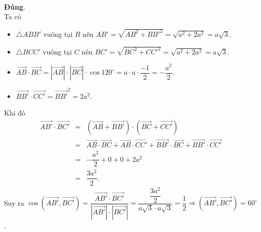 \begin{ex}
{\begin{itemchoice}
\begin{eqnarray*}
\end{eqnarray*}
\itemch \textbf{Đúng}.\\Ta có
\begin{itemize}
 \item $\triangle ABB'$ vuông tại $B$ nên $AB'=\sqrt{AB^2+BB'^2}=\sqrt{a^2+2a^2}=a\sqrt{3}$.
 \item $\triangle BCC'$ vuông tại $C$ nên $BC'=\sqrt{BC^2+CC'^2}=\sqrt{a^2+2a^2}=a\sqrt{3}$.
 \item $\overrightarrow{AB}\cdot\overrightarrow{BC}=\left|\overrightarrow{AB}\right|\cdot \left|\overrightarrow{BC}\right|\cdot \cos 120^\circ=a\cdot a\cdot\dfrac{-1}{2}=-\dfrac{a^2}{2}$.
 \item $\overrightarrow{BB'}\cdot\overrightarrow{CC'}=\overrightarrow{BB'}^2=2a^2$.
\end{itemize}
Khi đó
\allowdisplaybreaks
\begin{eqnarray*}
\overrightarrow{AB'}\cdot\overrightarrow{BC'}&=&\left(\overrightarrow{AB}+\overrightarrow{BB'}\right)\cdot\left(\overrightarrow{BC}+\overrightarrow{CC'}\right)\\ &=&\overrightarrow{AB}\cdot\overrightarrow{BC}+\overrightarrow{AB}\cdot\overrightarrow{CC'}+\overrightarrow{BB'}\cdot\overrightarrow{BC}+\overrightarrow{BB'}\cdot\overrightarrow{CC'}\\
&=&-\dfrac{a^2}{2}+0+0+2a^2\\&=&\dfrac{3a^2}{2}.
\end{eqnarray*}
Suy ra $\cos \left(\overrightarrow{AB'},\overrightarrow{BC'}\right)=\dfrac{\overrightarrow{AB'}\cdot\overrightarrow{BC'}}{\left|\overrightarrow{AB'}\right|\cdot\left|\overrightarrow{BC'}\right|}=\dfrac{\dfrac{3a^2}{2}}{a\sqrt{3}\cdot a\sqrt{3}}=\dfrac{1}{2} \Rightarrow \left(\overrightarrow{AB'}, \overrightarrow{BC'}\right)=60^\circ$.
\end{itemchoice}
}
\end{ex}


